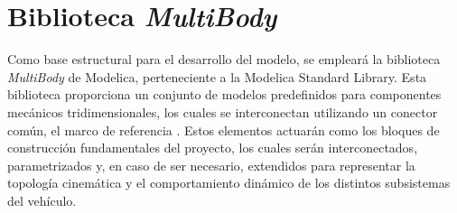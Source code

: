 







\section{Biblioteca \textit{MultiBody}}
Como base estructural para el desarrollo del modelo, se empleará la biblioteca \textit{MultiBody} de Modelica, perteneciente a la Modelica Standard Library. Esta biblioteca proporciona un conjunto de modelos predefinidos para componentes mecánicos tridimensionales, los cuales se interconectan utilizando un conector común, el marco de referencia \cite{msl_multibody}. Estos elementos actuarán como los bloques de construcción fundamentales del proyecto, los cuales serán interconectados, parametrizados y, en caso de ser necesario, extendidos para representar la topología cinemática y el comportamiento dinámico de los distintos subsistemas del vehículo.\\

